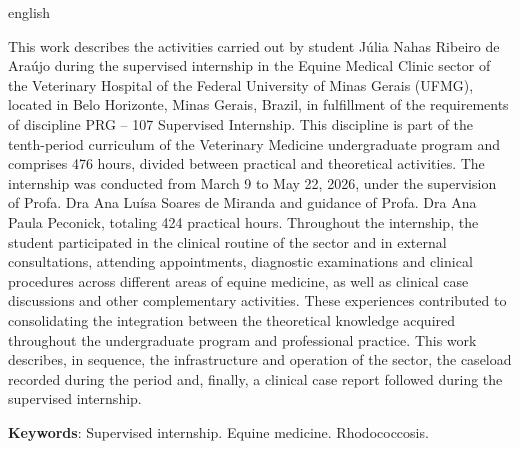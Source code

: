 \begin{resumo}[Abstract]
  \begin{otherlanguage*}{english}

This work describes the activities carried out by student Júlia Nahas
Ribeiro de Araújo during the supervised internship in the Equine Medical
Clinic sector of the Veterinary Hospital of the Federal University of
Minas Gerais (UFMG), located in Belo Horizonte, Minas Gerais, Brazil, in
fulfillment of the requirements of discipline PRG -- 107 Supervised
Internship. This discipline is part of the tenth-period curriculum of
the Veterinary Medicine undergraduate program and comprises 476 hours,
divided between practical and theoretical activities. The internship was
conducted from March 9 to May 22, 2026, under the supervision of Profa.
Dra Ana Luísa Soares de Miranda and guidance of Profa. Dra Ana Paula
Peconick, totaling 424 practical hours. Throughout the internship, the
student participated in the clinical routine of the sector and in
external consultations, attending appointments, diagnostic examinations
and clinical procedures across different areas of equine medicine, as
well as clinical case discussions and other complementary activities.
These experiences contributed to consolidating the integration between
the theoretical knowledge acquired throughout the undergraduate program
and professional practice. This work describes, in sequence, the
infrastructure and operation of the sector, the caseload recorded during
the period and, finally, a clinical case report followed during the
supervised internship.

\vspace{\onelineskip}

\noindent
\textbf{Keywords}: Supervised internship. Equine medicine. Rhodococcosis.

  \end{otherlanguage*}
\end{resumo}
